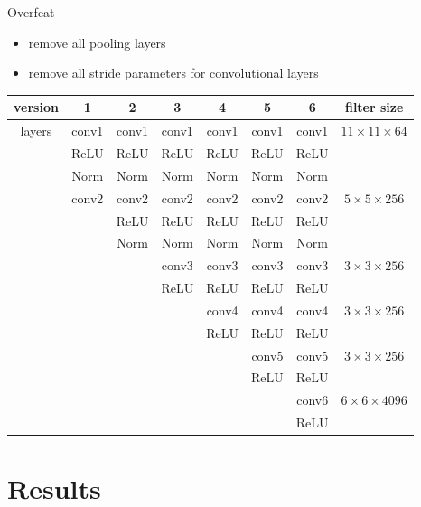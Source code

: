 \documentclass[11pt)]{beamer}
\begin{document}
\begin{frame}{Overfeat}
    \begin{itemize}
    \item remove all pooling layers
    \item remove all stride parameters for convolutional layers
  \end{itemize}
  \begin{table}
  \tiny
    \begin{tabular}{|c|c|c|c|c|c|c|c|} \hline
    version & 1 & 2 & 3 & 4 & 5 & 6 & filter size \\ \hline
    layers & conv1 & conv1 & conv1 & conv1 & conv1 & conv1 & $ 11 \times 11 \times 64$ \\ 
    & ReLU & ReLU & ReLU & ReLU & ReLU & ReLU & \\
    & Norm & Norm & Norm & Norm & Norm & Norm & \\
    & conv2 & conv2 & conv2 & conv2 & conv2 & conv2&  $ 5 \times 5 \times 256$ \\
    &  & ReLU & ReLU & ReLU & ReLU & ReLU & \\
    &  & Norm & Norm & Norm & Norm & Norm & \\
    & & & conv3 & conv3 & conv3 & conv3 &  $3 \times 3 \times 256 $\\
    &  &  & ReLU & ReLU & ReLU & ReLU & \\
    &  &  &  & conv4 & conv4 & conv4 &  $3 \times 3 \times 256 $\\
    &  &  &  & ReLU & ReLU & ReLU & \\
    &  &  &  &  & conv5 & conv5 &  $3 \times 3 \times 256 $\\
    &  &  &  &  & ReLU & ReLU & \\
    &   &   &   &  &  & conv6 &  $6 \times 6 \times 4096 $\\
    &  &  &  &  &  & ReLU & \\ \hline
    \end{tabular}
  \end{table}
\end{frame}

\section{Results}
\end{document}
